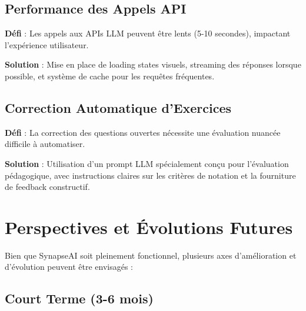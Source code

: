 \subsection*{Performance des Appels API}

\textbf{Défi} : Les appels aux APIs LLM peuvent être lents (5-10 secondes), impactant l'expérience utilisateur.

\textbf{Solution} : Mise en place de loading states visuels, streaming des réponses lorsque possible, et système de cache pour les requêtes fréquentes.

\subsection*{Correction Automatique d'Exercices}

\textbf{Défi} : La correction des questions ouvertes nécessite une évaluation nuancée difficile à automatiser.

\textbf{Solution} : Utilisation d'un prompt LLM spécialement conçu pour l'évaluation pédagogique, avec instructions claires sur les critères de notation et la fourniture de feedback constructif.

\section*{Perspectives et Évolutions Futures}

Bien que SynapseAI soit pleinement fonctionnel, plusieurs axes d'amélioration et d'évolution peuvent être envisagés :

\subsection*{Court Terme (3-6 mois)}

